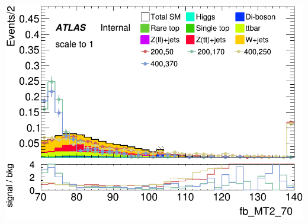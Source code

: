 \documentclass[usenames,dvipsnames]{beamer}
\begin{document}
\begin{frame}
\begin{minipage}{0.32\textwidth}
        \includegraphics[width=\textwidth]{graphics/LH_met_sig/LH_fb_MT2_70_norm.png}
    \end{minipage}
    
    \vspace{0.5cm}


\end{frame}
\end{document}
